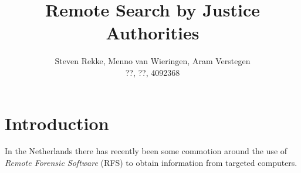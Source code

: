 \documentclass[11pt]{article} %
\title{Remote Search by Justice Authorities}
\author{Steven Rekke, Menno van Wieringen, Aram Verstegen \\ ??, ??, 4092368}
\date{} %
\begin{document}
\maketitle















\section{Introduction}
In the Netherlands there has recently been some commotion around the use of \textit{Remote Forensic Software} (RFS) to obtain information from targeted computers.
\end{document}
